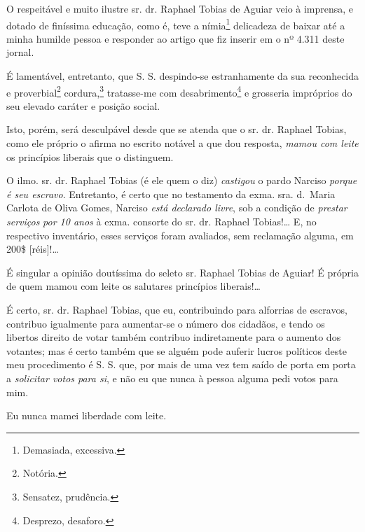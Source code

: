 {O respeitável e muito ilustre sr. dr. Raphael Tobias de Aguiar veio à
imprensa, e dotado de finíssima educação, como é, teve a
nímia\footnote{ Demasiada, excessiva.} delicadeza de baixar até a
minha humilde pessoa e responder ao artigo que fiz inserir em o nº 4.311
deste jornal.

É lamentável, entretanto, que S. S. despindo-se estranhamente da sua
reconhecida e proverbial\footnote{ Notória.} cordura,\footnote{
  Sensatez, prudência.} tratasse-me com desabrimento\footnote{
  Desprezo, desaforo.} e grosseria impróprios do seu elevado caráter e
posição social.

Isto, porém, será desculpável desde que se atenda que o sr. dr. Raphael
Tobias, como ele próprio o afirma no escrito notável a que dou resposta,
\emph{mamou com leite} os princípios liberais que o distinguem.

O ilmo. sr. dr. Raphael Tobias (é ele quem o diz) \emph{castigou} o
pardo Narciso \emph{porque é seu escravo}. Entretanto, é certo que no
testamento da exma. sra. d.~Maria Carlota de Oliva Gomes, Narciso
\emph{está declarado livre}, sob a condição de \emph{prestar serviços}
\emph{por 10 anos} à exma. consorte do sr. dr. Raphael Tobias!\ldots{} E, no
respectivo inventário, esses serviços foram avaliados, sem reclamação
alguma, em 200\$ {[}réis{]}!\ldots{}

É singular a opinião doutíssima do seleto sr. Raphael Tobias de Aguiar!
É própria de quem mamou com leite os salutares princípios
liberais!\ldots{}

É certo, sr. dr. Raphael Tobias, que eu, contribuindo para alforrias de
escravos, contribuo igualmente para aumentar-se o número dos cidadãos, e
tendo os libertos direito de votar também contribuo indiretamente para o
aumento dos votantes; mas é certo também que se alguém pode auferir
lucros políticos deste meu procedimento é S. S. que, por mais de uma vez
tem saído de porta em porta a \emph{solicitar votos para si}, e não eu
que nunca à pessoa alguma pedi votos para mim.

Eu nunca mamei liberdade com leite.

}
